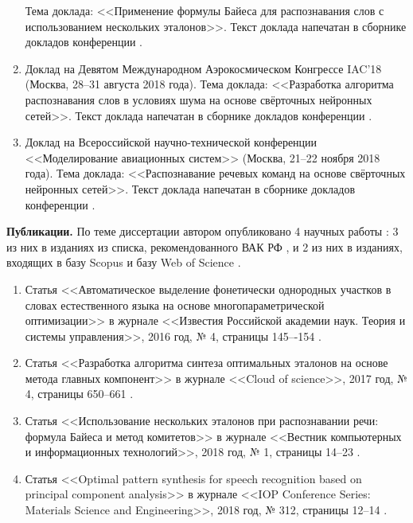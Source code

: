 \begin{enumerate}[label={\arabic*)}]
	Тема доклада: <<Применение формулы Байеса для распознавания слов с использованием нескольких эталонов>>.
	Текст доклада напечатан в сборнике докладов конференции \cite{poliyev2017bayes}.
	\item Доклад на Девятом Международном Аэрокосмическом Конгрессе IAC'18 (Москва, 28--31 августа 2018 года).
	Тема доклада: <<Разработка алгоритма распознавания слов в условиях шума на основе свёрточных нейронных сетей>>.
	Текст доклада напечатан в сборнике докладов конференции \cite{poliyev2018cnn}.
	\item Доклад на Всероссийской научно-технической конференции <<Моделирование авиационных систем>> (Москва, 21--22 ноября 2018 года).
	Тема доклада: <<Распознавание речевых команд на основе свёрточных нейронных сетей>>.
	Текст доклада напечатан в сборнике докладов конференции \cite{poliyev2018cnn2}.
\end{enumerate}

\textbf{Публикации.}
По теме диссертации автором опубликовано 4 научных работы \cite{korsun2016automatic,poliyev2017pca,korsun2018usage,korsun2018optimal}: 3 из них в изданиях из списка, рекомендованного ВАК РФ \cite{korsun2016automatic,poliyev2017pca,korsun2018usage}, и 2 из них в изданиях, входящих в базу Scopus и базу Web of Science \cite{korsun2016automatic,korsun2018optimal}.
\begin{enumerate}[label={\arabic*)}]
	\item Статья <<Автоматическое выделение фонетически однородных участков в словах естественного языка на основе многопараметрической оптимизации>> в журнале <<Известия Российской академии наук. Теория и системы управления>>, 2016 год, № 4, страницы 145–-154 \cite{korsun2016automatic}.
	\item Статья <<Разработка алгоритма синтеза оптимальных эталонов на основе метода главных компонент>> в журнале <<Cloud of science>>, 2017 год, № 4, страницы 650--661 \cite{poliyev2017pca}.
	\item Статья <<Использование нескольких эталонов при распознавании речи: формула Байеса и метод комитетов>> в журнале <<Вестник компьютерных и информационных технологий>>, 2018 год, № 1, страницы 14--23 \cite{korsun2018usage}.
	\item Статья <<Optimal pattern synthesis for speech recognition based on principal component analysis>> в журнале <<IOP Conference Series: Materials Science and Engineering>>, 2018 год, № 312, страницы 12--14 \cite{korsun2018optimal}.
\end{enumerate}

